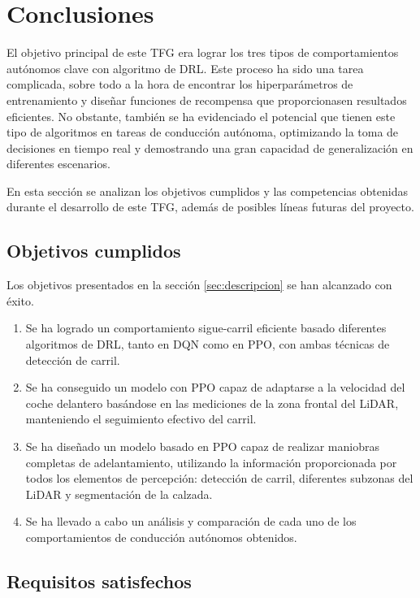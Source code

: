 \chapter{Conclusiones}
\label{cap:capitulo5}

El objetivo principal de este \ac{TFG} era lograr los tres tipos de comportamientos autónomos clave con algoritmo de \ac{DRL}. Este proceso ha sido una tarea complicada, sobre todo a la hora de encontrar los hiperparámetros de entrenamiento y diseñar funciones de recompensa que proporcionasen resultados eficientes. No obstante, también se ha evidenciado el potencial que tienen este tipo de algoritmos en tareas de conducción autónoma, optimizando la toma de decisiones en tiempo real y demostrando una gran capacidad de generalización en diferentes escenarios.

En esta sección se analizan los objetivos cumplidos y las competencias obtenidas durante el desarrollo de este \ac{TFG}, además de posibles líneas futuras del proyecto.
\section{Objetivos cumplidos}

Los objetivos presentados en la sección \ref{sec:descripcion} se han alcanzado con éxito.

\begin{enumerate}
\item Se ha logrado un comportamiento sigue-carril eficiente basado diferentes algoritmos de \ac{DRL}, tanto en \ac{DQN} como en \ac{PPO}, con ambas técnicas de detección de carril.
\item Se ha conseguido un modelo con \ac{PPO} capaz de adaptarse a la velocidad del coche delantero basándose en las mediciones de la zona frontal del \ac{LiDAR}, manteniendo el seguimiento efectivo del carril.
\item Se ha diseñado un modelo basado en \ac{PPO} capaz de realizar maniobras completas de adelantamiento, utilizando la información proporcionada por todos los elementos de percepción: detección de carril, diferentes subzonas del \ac{LiDAR} y segmentación de la calzada.
\item Se ha llevado a cabo un análisis y comparación de cada uno de los comportamientos de conducción autónomos obtenidos.
\end{enumerate}

\section{Requisitos satisfechos}

